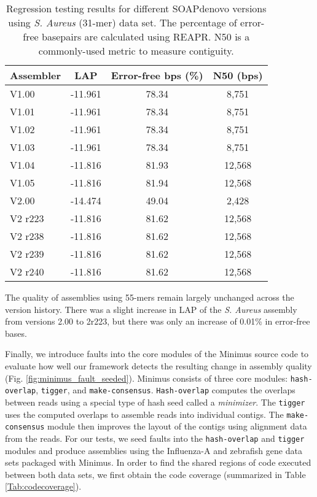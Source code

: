 \begin{table}[tb!]
\begin{center}
\caption{Regression testing results for different SOAPdenovo versions using \emph{S. Aureus} (31-mer) data set.  The percentage of error-free basepairs are calculated using REAPR. N50 is a commonly-used metric to measure contiguity.}
\begin{tabular}{l|ccc}
Assembler & LAP        & Error-free bps (\%) & N50 (bps)    \\
\hline
V1.00   & -11.961 & 78.34 & 8,751  \\
V1.01   & -11.961 & 78.34 & 8,751  \\
V1.02   & -11.961 & 78.34 & 8,751  \\
V1.03   & -11.961 & 78.34 & 8,751  \\
V1.04   & -11.816 & 81.93 & 12,568 \\
V1.05   & -11.816 & 81.94 & 12,568 \\
V2.00   & -14.474 & 49.04 & 2,428  \\
V2 r223 & -11.816 & 81.62 & 12,568 \\
V2 r238 & -11.816 & 81.62 & 12,568 \\
V2 r239 & -11.816 & 81.62 & 12,568 \\
V2 r240 & -11.816 & 81.62 & 12,568 \\
\hline
\end{tabular}
\end{center}
\label{table:soapdenovo_crudii}
\end{table}
\renewcommand{\baselinestretch}{2}
\small\normalsize



The quality of assemblies using 55-mers remain largely unchanged across the version history.
There was a slight increase in LAP of the \emph{S. Aureus} assembly from versions 2.00 to 2r223, but there was only an increase of 0.01\% in error-free bases.



Finally, we introduce faults into the core modules of the Minimus source code to evaluate how well our framework detects the resulting change in assembly quality (Fig. \ref{fig:minimus_fault_seeded}).
Minimus consists of three core modules: \texttt{hash-overlap}, \texttt{tigger}, and \texttt{make-consensus}.
\texttt{Hash-overlap} computes the overlaps between reads using a special type of hash seed called a \emph{minimizer}\cite{roberts2004reducing}.
The \texttt{tigger} uses the computed overlaps to assemble reads into individual contigs.
The \texttt{make-consensus} module then improves the layout of the contigs using alignment data from the reads.
For our tests, we seed faults into the \texttt{hash-overlap} and \texttt{tigger} modules and produce assemblies using the Influenza-A and zebrafish gene data sets packaged with Minimus.
In order to find the shared regions of code executed between both data sets, we first obtain the code coverage (summarized in Table \ref{Tab:codecoverage}).




